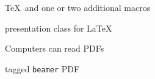  \begin{description}[
  label-align=left,
  label-width=\mylabelwidth+0.5em,
  left-margin=\mylabelwidth+1em,
  action-spec=<+->, ]
  \item[\LaTeX] \TeX\ and one or two
   additional macros
  \item[\texttt{beamer}] presentation
   class for \LaTeX
  \item[tagged PDFs] Computers can read PDFs
  \item[\texttt{ltx-talk}] tagged
   \texttt{beamer} PDF
 \end{description}
